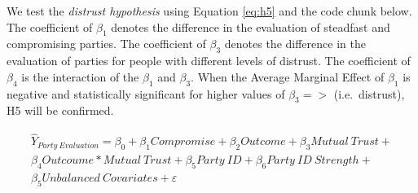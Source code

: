 \documentclass[]{article}
\begin{document}
We test the \emph{distrust hypothesis} using Equation \ref{eq:h5} and
the code chunk below. The coefficient of \(\beta_{1}\) denotes the
difference in the evaluation of steadfast and compromising parties. The
coefficient of \(\beta_{3}\) denotes the difference in the evaluation of
parties for people with different levels of distrust. The coefficient of
\(\beta_{4}\) is the interaction of the \(\beta_{1}\) and \(\beta_{3}\).
When the Average Marginal Effect of \(\beta_{1}\) is negative and
statistically significant for higher values of \(\beta_{3} = >\)
(i.e.~distrust), H5 will be confirmed.

\begin{equation}\label{eq:h5}
  \begin{aligned}
  \hat{Y}_{Party \ Evaluation} = \beta_{0} + \beta_{1}Compromise  +
      \beta_{2}Outcome + \beta_{3}Mutual \ Trust  +\nonumber \\
      \beta_{4}Outcoume * Mutual \ Trust + 
      \beta_{5}Party\ ID + \beta_{6}Party \ ID \ Strength +\nonumber \\
      \beta_{5}Unbalanced \ Covariates + \varepsilon
    \end{aligned}
\end{equation}
\end{document}
